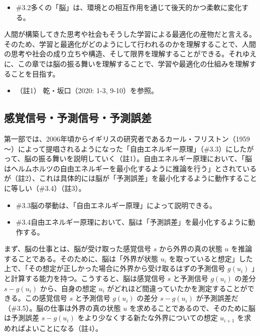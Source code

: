 \begin{note}{}
  \begin{itemize}
    \tightlist
    \item{\#3.2}多くの「脳」は、環境との相互作用を通じて後天的かつ柔軟に変化する。
  \end{itemize}
\end{note}

人間が構築してきた思考や社会もそうした学習による最適化の産物だと言える。そのため、学習と最適化がどのようにして行われるのかを理解することで、人間の思考や社会の成り立ちや構造、そして限界を理解することができる。それゆえに、この章では脳の振る舞いを理解することで、学習や最適化の仕組みを理解することを目指す。

\begin{itemize}
\tightlist
\item
  （註1） 乾・坂口（2020: 1-3, 9-10）\cite{InuiAndSakaguchi}を参照。
\end{itemize}

\subsection{感覚信号・予測信号・予測誤差}\label{ux611fux899aux4fe1ux53f7ux4e88ux6e2cux4fe1ux53f7ux4e88ux6e2cux8aa4ux5dee}

第一部では、2006年頃からイギリスの研究者であるカール・フリストン（1959～）によって提唱されるようになった「自由エネルギー原理」（\#3.3）にしたがって、脳の振る舞いを説明していく（註1）。自由エネルギー原理において、「脳はヘルムホルツの自由エネルギーを最小化するように推論を行う」とされているが（註2）、これは具体的には脳が「予測誤差」を最小化するように動作することに等しい（\#3.4）（註3）。

\begin{note}{}
  \begin{itemize}
    \tightlist
    \item{\#3.3}脳の挙動は、「自由エネルギー原理」によって説明できる。
    \item{\#3.4}自由エネルギー原理において、脳は「予測誤差」を最小化するように動作する。
  \end{itemize}
\end{note}

まず、脳の仕事とは、脳が受け取った感覚信号 \(s\) から外界の真の状態
\(u\) を推論することである。そのために、脳は「外界が状態 \(u_i\)
を取っていると想定」した上で、「その想定が正しかった場合に外界から受け取るはずの予測信号
\(g(u_i)\) 」と計算する能力を持つ。こうすると、脳は感覚信号 \(s\)
と予測信号 \(g(u_i)\) の差分 \(s-g(u_i)\) から、自身の想定 \(u_i\)
がどれほど間違っていたかを測定することができる。この感覚信号 \(s\)
と予測信号 \(g(u_i)\) の差分 \(s-g(u_i)\)
が予測誤差だ（\#3.5）。脳の仕事は外界の真の状態 \(u\)
を求めることであるので、そのために脳は予測誤差 \(s-g(u_i)\)
をより少なくする新たな外界についての想定 \(u_{i+1}\)
を求めればよいことになる（註4）。

